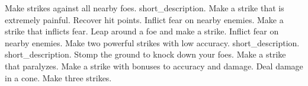 \begin{spelllist}
 Make strikes against all nearby foes.
 short_description.
 Make a strike that is extremely painful.
 Recover hit points.
 Inflict fear on nearby enemies.
 Make a strike that inflicts fear.
 Leap around a foe and make a strike.
 Inflict fear on nearby enemies.
 Make two powerful strikes with low accuracy.
 short_description.
 short_description.
 Stomp the ground to knock down your foes.
 Make a strike that paralyzes.
 Make a strike with bonuses to accuracy and damage.
 Deal damage in a cone.
 Make three strikes.
\end{spelllist}



\small
